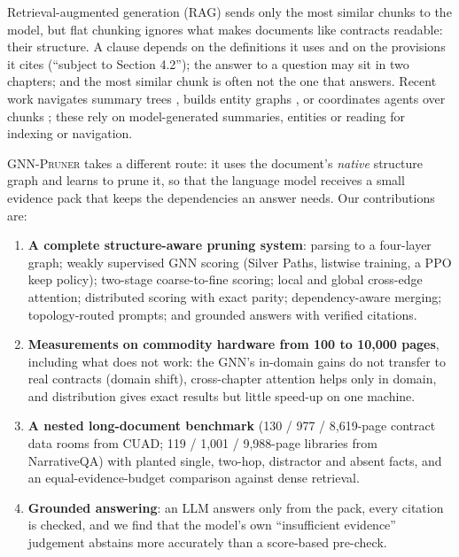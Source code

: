 \documentclass[11pt]{article}
\newcommand{\system}{\textsc{GNN-Pruner}}
\begin{document}
Retrieval-augmented generation (RAG) \citep{lewis2020rag,izacard2021fid} sends only the most similar chunks to the model, but flat chunking ignores what makes documents like contracts readable: their structure. A clause depends on the definitions it uses and on the provisions it cites (``subject to Section 4.2''); the answer to a question may sit in two chapters; and the most similar chunk is often not the one that answers. Recent work navigates summary trees \citep{sarthi2024raptor,chen2023memwalker,pageindex2025}, builds entity graphs \citep{edge2024graphrag,gutierrez2024hipporag}, or coordinates agents over chunks \citep{zhang2024chainofagents}; these rely on model-generated summaries, entities or reading for indexing or navigation.

\system{} takes a different route: it uses the document's \emph{native} structure graph and learns to prune it, so that the language model receives a small evidence pack that keeps the dependencies an answer needs. Our contributions are:
\begin{enumerate}
  \item \textbf{A complete structure-aware pruning system}: parsing to a four-layer graph; weakly supervised GNN scoring (Silver Paths, listwise training, a PPO keep policy); two-stage coarse-to-fine scoring; local and global cross-edge attention; distributed scoring with exact parity; dependency-aware merging; topology-routed prompts; and grounded answers with verified citations.
  \item \textbf{Measurements on commodity hardware from 100 to 10,000 pages}, including what does not work: the GNN's in-domain gains do not transfer to real contracts (domain shift), cross-chapter attention helps only in domain, and distribution gives exact results but little speed-up on one machine.
  \item \textbf{A nested long-document benchmark} (130 / 977 / 8,619-page contract data rooms from CUAD; 119 / 1,001 / 9,988-page libraries from NarrativeQA) with planted single, two-hop, distractor and absent facts, and an equal-evidence-budget comparison against dense retrieval.
  \item \textbf{Grounded answering}: an LLM answers only from the pack, every citation is checked, and we find that the model's own ``insufficient evidence'' judgement abstains more accurately than a score-based pre-check.
\end{enumerate}

\end{document}
